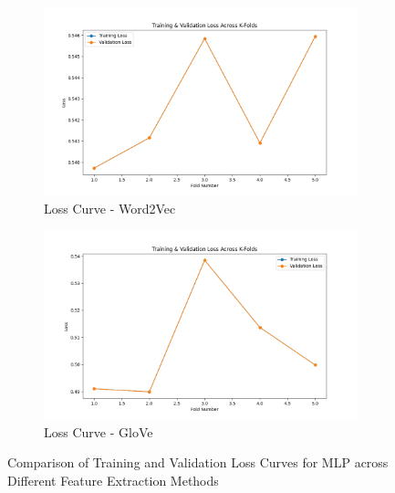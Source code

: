 \begin{figure}[H]
    \begin{subfigure}[b]{0.44\textwidth}
        \includegraphics[width=\textwidth]{img/report_info/img/2.2.MLP/best_mlp_word2vec_loss.png}
        \caption{Loss Curve - Word2Vec}
        \label{fig:mlp-word2vec-loss}
    \end{subfigure}
    \begin{subfigure}[b]{0.44\textwidth}
        \includegraphics[width=\textwidth]{img/report_info/img/2.2.MLP/best_mlp_glove_loss.png}
        \caption{Loss Curve - GloVe}
        \label{fig:mlp-glove-loss}
    \end{subfigure}
    
    \caption{Comparison of Training and Validation Loss Curves for MLP across Different Feature Extraction Methods}
    \label{fig:mlp-loss-group}
\end{figure}


